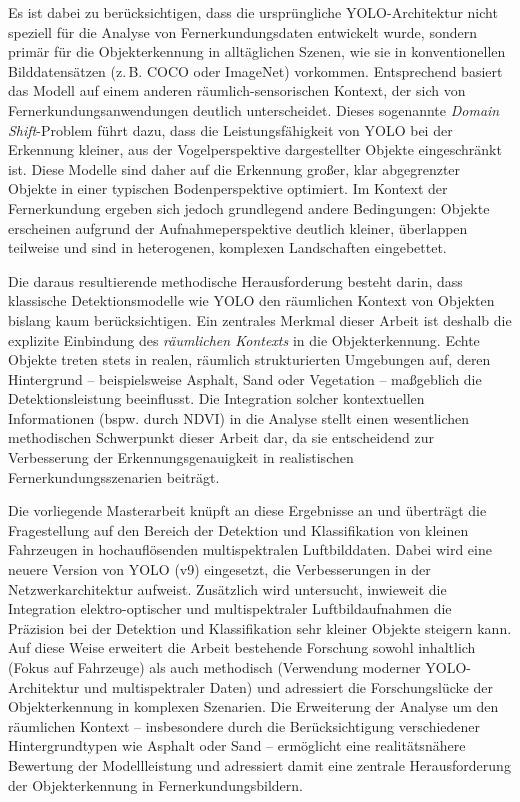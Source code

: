 Es ist dabei zu berücksichtigen, dass die ursprüngliche \acrfull{YOLO}-Architektur nicht speziell für die Analyse von Fernerkundungsdaten entwickelt wurde, sondern primär für die Objekterkennung in alltäglichen Szenen, wie sie in konventionellen Bilddatensätzen (z.\,B. \acrshort{COCO} oder ImageNet) vorkommen. Entsprechend basiert das Modell auf einem anderen räumlich-sensorischen Kontext, der sich von Fernerkundungsanwendungen deutlich unterscheidet. Dieses sogenannte \emph{Domain Shift}-Problem führt dazu, dass die Leistungsfähigkeit von YOLO bei der Erkennung kleiner, aus der Vogelperspektive dargestellter Objekte eingeschränkt ist. Diese Modelle sind daher auf die Erkennung großer, klar abgegrenzter Objekte in einer typischen Bodenperspektive optimiert. Im Kontext der Fernerkundung ergeben sich jedoch grundlegend andere Bedingungen: Objekte erscheinen aufgrund der Aufnahmeperspektive deutlich kleiner, überlappen teilweise und sind in heterogenen, komplexen Landschaften eingebettet. 

Die daraus resultierende methodische Herausforderung besteht darin, dass klassische Detektionsmodelle wie YOLO den räumlichen Kontext von Objekten bislang kaum berücksichtigen. Ein zentrales Merkmal dieser Arbeit ist deshalb die explizite Einbindung des \emph{räumlichen Kontexts} in die Objekterkennung. Echte Objekte treten stets in realen, räumlich strukturierten Umgebungen auf, deren Hintergrund – beispielsweise Asphalt, Sand oder Vegetation – maßgeblich die Detektionsleistung beeinflusst. Die Integration solcher kontextuellen Informationen (bspw. durch \acrshort{NDVI}) in die Analyse stellt einen wesentlichen methodischen Schwerpunkt dieser Arbeit dar, da sie entscheidend zur Verbesserung der Erkennungsgenauigkeit in realistischen Fernerkundungsszenarien beiträgt.

Die vorliegende Masterarbeit knüpft an diese Ergebnisse an und überträgt die Fragestellung auf den Bereich der Detektion und Klassifikation von kleinen Fahrzeugen in hochauflösenden multispektralen Luftbilddaten. Dabei wird eine neuere Version von \acrfull{YOLO} (v9) eingesetzt, die Verbesserungen in der Netzwerkarchitektur aufweist. Zusätzlich wird untersucht, inwieweit die Integration elektro-optischer und multispektraler Luftbildaufnahmen die Präzision bei der Detektion und Klassifikation sehr kleiner Objekte steigern kann. Auf diese Weise erweitert die Arbeit bestehende Forschung sowohl inhaltlich (Fokus auf Fahrzeuge) als auch methodisch (Verwendung moderner YOLO-Architektur und multispektraler Daten) und adressiert die Forschungslücke der Objekterkennung in komplexen Szenarien. Die Erweiterung der Analyse um den räumlichen Kontext – insbesondere durch die Berücksichtigung verschiedener Hintergrundtypen wie Asphalt oder Sand – ermöglicht eine realitätsnähere Bewertung der Modellleistung und adressiert damit eine zentrale Herausforderung der Objekterkennung in Fernerkundungsbildern.




